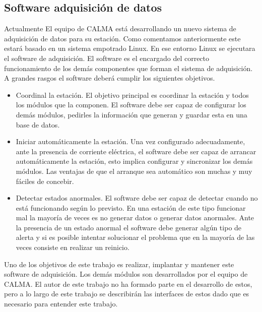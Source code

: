 	\subsection{Software adquisición de datos}
		Actualmente El equipo de CALMA está desarrollando un nuevo sistema de adquisición de datos para su estación. Como comentamos
		anteriormente este estará basado en un sistema empotrado Linux. En ese entorno Linux se ejecutara el software de adquisición. El software
		es el encargado del correcto funcionamiento de los demás componentes que forman el sistema de adquisición. A grandes rasgos
		el software deberá cumplir los siguientes objetivos.
		\begin{itemize}
			\item 	Coordinal la estación. El objetivo principal es coordinar la estación y todos los módulos que la componen. El software
			  	debe ser capaz de configurar los demás módulos, pedirles la información que generan y guardar esta en una base de datos. 
			\item 	Iniciar automáticamente la estación. Una vez configurado adecuadamente, ante la presencia de corriente eléctrica, el
			  	software debe ser capaz de arrancar automáticamente la estación, esto implica configurar y sincronizar los demás
				módulos. Las ventajas de que el arranque sea automático son muchas y muy fáciles de concebir.
			\item 	Detectar estados anormales. El software debe ser capaz de detectar cuando no está funcionando según lo previsto. En
			  	una estación de este tipo funcionar mal la mayoría de veces es no generar datos o generar datos anormales. Ante la
				presencia de un estado anormal el software debe generar algún tipo de alerta y si es posible intentar solucionar el
				problema que en la mayoría de las veces consiste en realizar un reinicio.
		\end{itemize}
		Uno de los objetivos de este trabajo es realizar, implantar y mantener este software de adquisición. Los demás módulos son desarrollados
		por el equipo de CALMA. El autor de este trabajo no ha formado parte en el desarrollo de estos, pero a lo largo de este trabajo se
		describirán las interfaces de estos dado que es necesario para entender este trabajo. 
